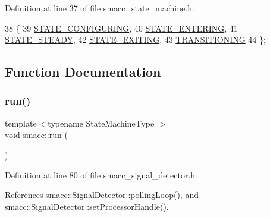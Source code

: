 Definition at line 37 of file smacc\+\_\+state\+\_\+machine.\+h.


\begin{DoxyCode}
38 \{
39     \hyperlink{namespacesmacc_a0889aff43c93fe5285109819d2898144a32406d3560b9f36b3e6e3b84454e1be5}{STATE\_CONFIGURING},
40     \hyperlink{namespacesmacc_a0889aff43c93fe5285109819d2898144aef27ae3e54b805b81e1efacea3c02575}{STATE\_ENTERING},
41     \hyperlink{namespacesmacc_a0889aff43c93fe5285109819d2898144aaefffb251a9a48e0e3274e9475d22749}{STATE\_STEADY},
42     \hyperlink{namespacesmacc_a0889aff43c93fe5285109819d2898144a22bd5bb7935dd66f181d92efc273951e}{STATE\_EXITING},
43     \hyperlink{namespacesmacc_a0889aff43c93fe5285109819d2898144a5e174e130ee1847f37541ba5786207a3}{TRANSITIONING}
44 \};
\end{DoxyCode}


\subsection{Function Documentation}
\mbox{\label{namespacesmacc_a47ac3b8d2968b1ba4152afd64ab66bd0}} 
\subsubsection{\texorpdfstring{run()}{run()}}
{\footnotesize\ttfamily template$<$typename State\+Machine\+Type $>$ \\
void smacc\+::run (\begin{DoxyParamCaption}{ }\end{DoxyParamCaption})}



Definition at line 80 of file smacc\+\_\+signal\+\_\+detector.\+h.



References smacc\+::\+Signal\+Detector\+::polling\+Loop(), and smacc\+::\+Signal\+Detector\+::set\+Processor\+Handle().


